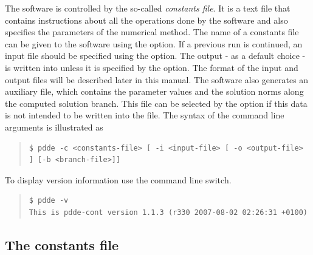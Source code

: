 \documentclass[10pt,a4paper]{ddedoc}
\begin{document}
The software is controlled by the so-called \emph{constants file}. It is a text file
that contains instructions about all the operations done by the software and
also specifies the parameters of the numerical method.
The name of a constants file can be given to the software using the  option.
If a previous run is continued, an input file should be specified using the  option. 
The output - as a default choice - is written into  unless it is specified
by the  option. The format of the input and output files will
be described later in this manual. The software also generates an auxiliary file,
which contains the parameter values and the solution norms along the computed
solution branch.
This file can be selected by the  option if this data is not intended
to be written into the  file. The syntax of the command line
arguments is illustrated as
{ \small \begin{quote} \begin{lstlisting}[basicstyle=\tt,frame=single]
$ pdde -c <constants-file> [ -i <input-file> [ -o <output-file> ] [-b <branch-file>]]
\end{lstlisting} \end{quote} } \noindent
To display version information use the  command line switch.
{ \small \begin{quote} \begin{lstlisting}[basicstyle=\tt,frame=single]
$ pdde -v
This is pdde-cont version 1.1.3 (r330 2007-08-02 02:26:31 +0100)
\end{lstlisting} \end{quote} } \noindent


\subsection{The constants file}
\label{constfile}
\end{document}

